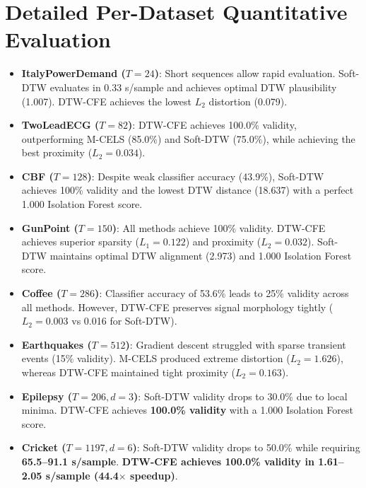 \documentclass[11pt,a4paper]{report}
\begin{document}
\section{Detailed Per-Dataset Quantitative Evaluation}
\begin{itemize}
    \item \textbf{ItalyPowerDemand ($T=24$)}: Short sequences allow rapid evaluation. Soft-DTW evaluates in 0.33 s/sample and achieves optimal DTW plausibility (1.007). DTW-CFE achieves the lowest $L_2$ distortion (0.079).
    \item \textbf{TwoLeadECG ($T=82$)}: DTW-CFE achieves 100.0\% validity, outperforming M-CELS (85.0\%) and Soft-DTW (75.0\%), while achieving the best proximity ($L_2 = 0.034$).
    \item \textbf{CBF ($T=128$)}: Despite weak classifier accuracy (43.9\%), Soft-DTW achieves 100\% validity and the lowest DTW distance (18.637) with a perfect 1.000 Isolation Forest score.
    \item \textbf{GunPoint ($T=150$)}: All methods achieve 100\% validity. DTW-CFE achieves superior sparsity ($L_1 = 0.122$) and proximity ($L_2 = 0.032$). Soft-DTW maintains optimal DTW alignment (2.973) and 1.000 Isolation Forest score.
    \item \textbf{Coffee ($T=286$)}: Classifier accuracy of 53.6\% leads to 25\% validity across all methods. However, DTW-CFE preserves signal morphology tightly ($L_2 = 0.003$ vs 0.016 for Soft-DTW).
    \item \textbf{Earthquakes ($T=512$)}: Gradient descent struggled with sparse transient events (15\% validity). M-CELS produced extreme distortion ($L_2 = 1.626$), whereas DTW-CFE maintained tight proximity ($L_2 = 0.163$).
    \item \textbf{Epilepsy ($T=206, d=3$)}: Soft-DTW validity drops to 30.0\% due to local minima. DTW-CFE achieves \textbf{100.0\% validity} with a 1.000 Isolation Forest score.
    \item \textbf{Cricket ($T=1197, d=6$)}: Soft-DTW validity drops to 50.0\% while requiring \textbf{65.5--91.1 s/sample}. \textbf{DTW-CFE achieves 100.0\% validity in 1.61--2.05 s/sample (44.4$\times$ speedup)}.
\end{itemize}
\end{document}
